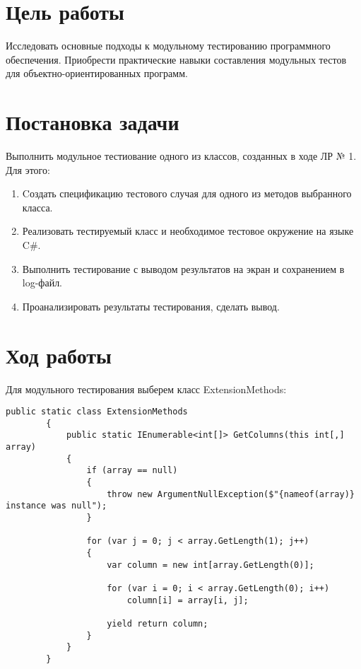 \documentclass[a4paper,14pt]{extarticle}
\begin{document}

    \section{Цель работы}

    Исследовать основные подходы к модульному тестированию программного
    обеспечения. Приобрести практические навыки составления модульных тестов
    для объектно-ориентированных программ.

    \section{Постановка задачи}

    Выполнить модульное тестиование одного из классов, созданных в ходе ЛР № 1.
    Для этого:
    \begin{enumerate}
        \item Cоздать спецификацию тестового случая для одного из методов выбранного
              класса.
        \item Реализовать тестируемый класс и необходимое тестовое
              окружение на языке C\#.
        \item Выполнить тестирование с выводом результатов на экран и сохранением 
              в log-файл.
        \item Проанализировать результаты тестирования, сделать вывод.
    \end{enumerate}

    \section{Ход работы}

    Для модульного тестирования выберем класс ExtensionMethods:

    \begin{lstlisting}[language={[Sharp]C}]
        public static class ExtensionMethods
        {
            public static IEnumerable<int[]> GetColumns(this int[,] array)
            {
                if (array == null)
                {
                    throw new ArgumentNullException($"{nameof(array)} instance was null");
                }

                for (var j = 0; j < array.GetLength(1); j++)
                {
                    var column = new int[array.GetLength(0)];

                    for (var i = 0; i < array.GetLength(0); i++)
                        column[i] = array[i, j];

                    yield return column;
                }
            }
        }
    \end{lstlisting}
\end{document}
